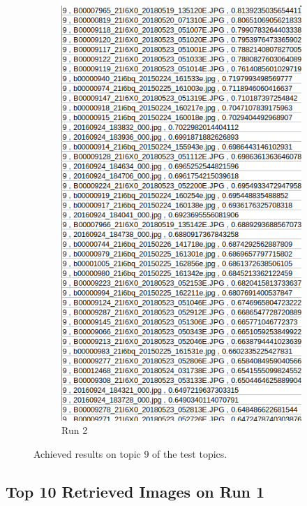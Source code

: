 \begin{figure}[H]
\begin{subfigure}{0.385\textwidth}
  \includegraphics[width=\textwidth]{Sections/7Results/images/topic9results2.png}
  \caption{Run 2}
  \end{subfigure}
  \caption{Achieved results on topic 9 of the test topics.}
  \label{fig:runs_csv}
\end{figure}

\newpage




\subsection{Top 10 Retrieved Images on Run 1}
\label{sec:run1_retrieved}

